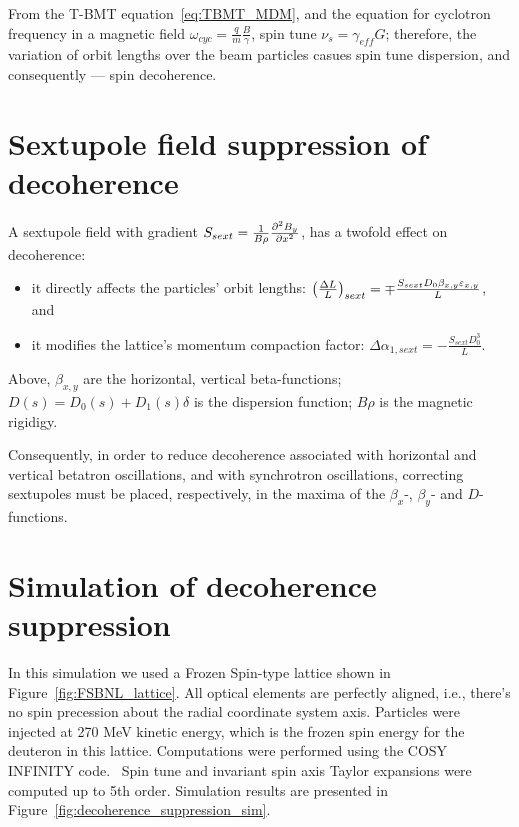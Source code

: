 \documentclass[a4paper]{jacow}
\newcommand{\w}{\omega}
\begin{document}
From the T-BMT equation~\eqref{eq:TBMT_MDM}, and the equation for cyclotron frequency in a magnetic field
$\w_{cyc} = \frac qm \frac B\gamma$, spin tune $\nu_s = \gamma_{eff}G$; therefore, the variation of
orbit lengths over the beam particles casues spin tune dispersion, and consequently --- spin decoherence.

\section{Sextupole field suppression of decoherence}
A sextupole field with gradient $ S_{sext} = \frac{1}{B\rho} \pddx{B_y}[x][2]$, has a twofold effect
on decoherence:
\begin{itemize}
\item it directly affects the particles' orbit lengths:
  $\bkt{\frac{\Delta L}{L}}_{sext} = \mp \frac{S_{sext}D_0\beta_{x,y}\varepsilon_{x,y}}{L}$, and
\item it modifies the lattice's momentum compaction factor: $\Delta \alpha_{1,sext} = -\frac{S_{sext}D_0^3}{L}$.
\end{itemize}
Above, $\beta_{x,y}$ are the horizontal, vertical beta-functions;
$D(s) = D_0(s) + D_1(s)\delta$ is the dispersion function; $B\rho$ is the magnetic rigidigy.

Consequently, in order to reduce decoherence associated with horizontal and vertical betatron oscillations,
and with synchrotron oscillations, correcting sextupoles must be placed, respectively, in the maxima of
the $\beta_x$-, $\beta_y$- and $D$-functions.
\section{Simulation of decoherence suppression}
In this simulation we used a Frozen Spin-type lattice shown in Figure~\ref{fig:FSBNL_lattice}.
All optical elements are perfectly aligned, i.e., there's no spin precession about the
radial coordinate system axis. Particles were injected at 270 MeV kinetic energy, which is the
frozen spin energy for the deuteron in this lattice. Computations were performed using the
COSY INFINITY code.~\cite{COSY:Website} Spin tune and invariant spin axis Taylor expansions
were computed up to 5th order. Simulation results are presented in Figure~\ref{fig:decoherence_suppression_sim}.
\end{document}

